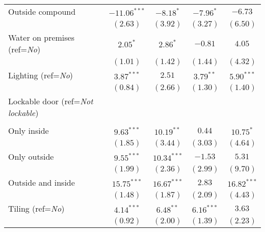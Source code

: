 \begin{center}
\begin{scriptsize}
\begin{ThreePartTable}
\begin{longtable}{l@{} c@{} c@{} c@{} c@{}}
\quad Outside compound                                     & $-11.06^{***}$ & $-8.18^{*}$    & $-7.96^{*}$   & $-6.73$       \\
                                                           & $(2.63)$       & $(3.92)$       & $(3.27)$      & $(6.50)$      \\
Water on premises (ref=\textit{No})                        & $2.05^{*}$     & $2.86^{*}$     & $-0.81$       & $4.05$        \\
                                                           & $(1.01)$       & $(1.42)$       & $(1.44)$      & $(4.32)$      \\
Lighting (ref=\textit{No})                                 & $3.87^{***}$   & $2.51$         & $3.79^{**}$   & $5.90^{***}$  \\
                                                           & $(0.84)$       & $(2.66)$       & $(1.30)$      & $(1.40)$      \\
Lockable door (ref=\textit{Not lockable})                  &                &                &               &               \\
                                                           &                &                &               &               \\
\quad Only inside                                          & $9.63^{***}$   & $10.19^{**}$   & $0.44$        & $10.75^{*}$   \\
                                                           & $(1.85)$       & $(3.44)$       & $(3.03)$      & $(4.64)$      \\
\quad Only outside                                         & $9.55^{***}$   & $10.34^{***}$  & $-1.53$       & $5.31$        \\
                                                           & $(1.99)$       & $(2.36)$       & $(2.99)$      & $(9.70)$      \\
\quad Outside and inside                                   & $15.75^{***}$  & $16.67^{***}$  & $2.83$        & $16.82^{***}$ \\
                                                           & $(1.48)$       & $(1.87)$       & $(2.09)$      & $(4.43)$      \\
Tiling (ref=\textit{No})                                   & $4.14^{***}$   & $6.48^{**}$    & $6.16^{***}$  & $3.63$        \\
                                                           & $(0.92)$       & $(2.00)$       & $(1.39)$      & $(2.23)$      \\

\end{longtable}
\end{ThreePartTable}
\end{scriptsize}
\end{center}

